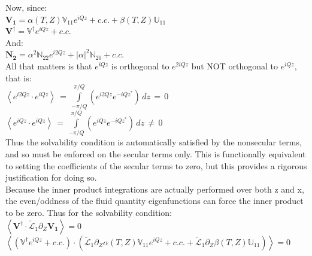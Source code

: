 \documentclass[letterpaper,12pt]{article}
\begin{document}
Now, since: \\

$\mathbf{V_1} = \alpha(T, Z) \mathbb{V}_{11} e^{i Q z} + c.c. + \beta(T, Z)\mathbb{U}_{11}$ \\

$\mathbf{V}^\dagger = \mathbb{V}^\dagger e^{iQz} + c.c.$ \\

And: \\

$\mathbf{N_2} = \alpha^2\mathbb{N}_{22} e^{i2Qz} + \left|\alpha\right|^2 \mathbb{N}_{20} + c.c.$ \\

All that matters is that $e^{iQz}$ is orthogonal to $e^{2iQz}$ but NOT orthogonal to $e^{iQz}$, that is: \\

$\left< e^{i2Qz} \cdot e^{iQz} \right> \, = \, \int \limits_{-\pi/Q}^{\pi/Q} \left(e^{i2Qz}e^{-iQz^*}\right) \, dz \, = \, 0$\\

$\left< e^{iQz} \cdot e^{iQz} \right> \, = \, \int \limits_{-\pi/Q}^{\pi/Q} \left(e^{iQz}e^{-iQz^*}\right) \, dz \, \ne \, 0$\\

Thus the solvability condition is automatically satisfied by the nonsecular terms, and so must be enforced on the secular terms only. This is functionally equivalent to setting the coefficients of the secular terms to zero, but this provides a rigorous justification for doing so. \\

Because the inner product integrations are actually performed over both z and x, the even/oddness of the fluid quantity eigenfunctions can force the inner product to be zero. Thus for the solvability condition: \\

 $\left< \mathbf{V}^\dagger \cdot \widetilde{\mathcal{L}}_1 \partial_Z \mathbf{V_1}\right> = 0 $ \\
 
 $\left< \left(\mathbb{V}^\dagger e^{iQz} + c.c.\right) \cdot \left(\widetilde{\mathcal{L}}_1 \partial_Z \alpha(T, Z) \mathbb{V}_{11} e^{i Q z} + c.c. + \widetilde{\mathcal{L}}_1 \partial_Z \beta(T, Z)\mathbb{U}_{11}\right) \right> = 0$ \\
 
\end{document}
